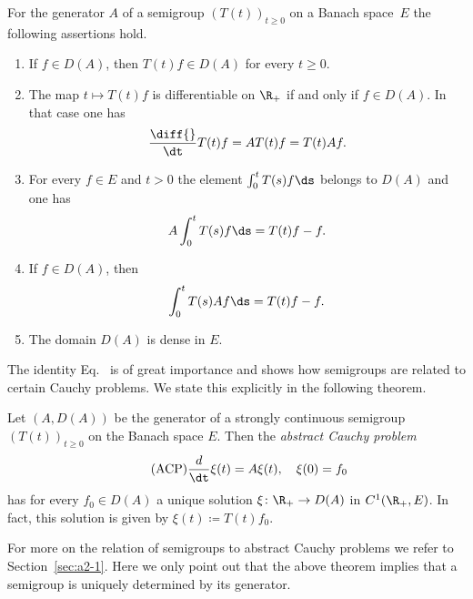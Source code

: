\begin{proposition}\label{prop:a1-1.6}
For the generator $A$ of a semigroup $(T(t))_{t \geq 0}$ on a Banach space~$E$ the following assertions hold.
\begin{enumerate}[\upshape(i)]
\item
If\/ $f \in D(A)$, then $T(t)f \in D(A)$ for every $t \geq 0$.

\item
The map $t \mapsto T(t)f$ is differentiable on $\R_{+}$ if and only if\/ $f \in D(A)$.
In that case one has
\begin{equation}\label{eq:a1-1.2}
    \frac{\diff{}}{\dt} T(t)f = AT(t)f = T(t)Af .
\end{equation}
\item
For every $f \in E$ and $t > 0$ the element $\int_0^t T(s)f \ds$ belongs to $D(A)$ and one has
\begin{equation}\label{eq:a1-1.3}
    A\int_0^t T(s)f \ds = T(t)f - f  .
\end{equation}
\item
If\/ $f \in D(A)$, then
\begin{equation}\label{eq:a1-1.4}
    \int_0^t T(s)Af \ds = T(t)f - f  .
\end{equation}

\item
The domain $D(A)$ is dense in $E$.
\end{enumerate}
\end{proposition}
The identity Eq.~ is of great importance and shows how semigroups are related to certain Cauchy problems.
We state this explicitly in the following theorem.
\begin{theorem}\label{thm:a1-1.7}
Let $(A,D(A))$ be the generator of a strongly continuous semigroup $(T(t))_{t \geq 0}$ on the Banach space $E$.
Then the \emph{abstract Cauchy problem}
\begin{equation}\label{eq:a1-1.5.ACP} \tag{ACP}
\frac{d}{\dt}\xi(t) = A\xi(t), \quad \xi(0) = f_{0}
\end{equation}
has for every $f_{0} \in D(A)$ a unique solution $\xi \colon \R_{+} \to D(A)$ in $C^1(\R_{+},E)$.
In fact, this solution is given by $\xi(t) \coloneqq T(t)f_{0}$.
\end{theorem}
For more on the relation of semigroups to abstract Cauchy problems we refer to Section~\ref{sec:a2-1}.
Here we only point out that the above theorem implies that a semigroup is uniquely determined by its generator.

